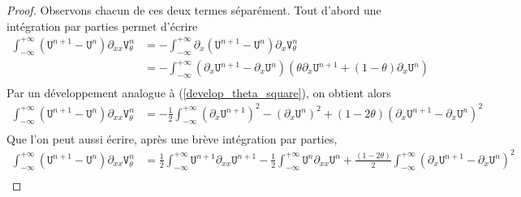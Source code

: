 \documentclass[12pt,a4paper]{article}
\numberwithin{equation}{section}
\begin{document}
\begin{proof}
Observons chacun de ces deux termes séparément. Tout d'abord une intégration par parties permet d'écrire
\begin{equation*}
\begin{split}
    \int_{-\infty}^{+\infty}(\texttt{U}^{n+1}-\texttt{U}^n)\partial_{xx}\texttt{V}_\theta^n
    &= -\int_{-\infty}^{+\infty}\partial_{x}(\texttt{U}^{n+1}-\texttt{U}^n)\partial_{x}\texttt{V}_\theta^n\\
    &= -\int_{-\infty}^{+\infty}(\partial_{x}\texttt{U}^{n+1}-\partial_{x}\texttt{U}^n)(\theta\partial_{x}\texttt{U}^{n+1}+(1-\theta)\partial_{x}\texttt{U}^n)\\
\end{split}
\end{equation*}
Par un développement analogue à (\ref{develop_theta_square}), on obtient alors
\begin{equation*}
\begin{split}
    \int_{-\infty}^{+\infty}(\texttt{U}^{n+1}-\texttt{U}^n)\partial_{xx}\texttt{V}_\theta^n
    &= -\frac{1}{2}\int_{-\infty}^{+\infty} (\partial_{x}\texttt{U}^{n+1})^2-(\partial_{x}\texttt{U}^n)^2 + (1-2\theta)(\partial_{x}\texttt{U}^{n+1}-\partial_{x}\texttt{U}^n)^2\\
\end{split}
\end{equation*}
Que l'on peut aussi écrire, après une brève intégration par parties, 
\begin{equation}\label{energy_theta_dem2}
\begin{split}
    \int_{-\infty}^{+\infty}(\texttt{U}^{n+1}-\texttt{U}^n)\partial_{xx}\texttt{V}_\theta^n
    &= \frac{1}{2}\int_{-\infty}^{+\infty} \texttt{U}^{n+1}\partial_{xx}\texttt{U}^{n+1} - \frac{1}{2}\int_{-\infty}^{+\infty}\texttt{U}^{n}\partial_{xx}\texttt{U}^{n} + \frac{(1-2\theta)}{2}\int_{-\infty}^{+\infty}(\partial_{x}\texttt{U}^{n+1}-\partial_{x}\texttt{U}^n)^2\\
\end{split}
\end{equation}


\end{proof}
\end{document}
